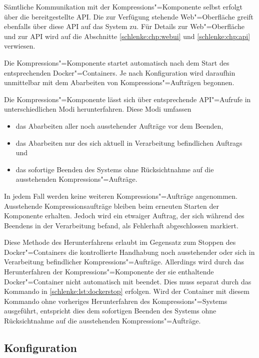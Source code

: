 Sämtliche Kommunikation mit der Kompressions"=Komponente selbst erfolgt über die bereitgestellte API. Die zur Verfügung stehende Web"=Oberfläche greift ebenfalls über diese API auf das System zu. Für Details zur Web"=Oberfläche und zur API wird auf die Abschnitte \ref{schlenke:chp:webui} und \ref{schlenke:chp:api} verwiesen.

Die Kompressions"=Komponente startet automatisch nach dem Start des entsprechenden Docker"=Containers. Je nach Konfiguration wird daraufhin unmittelbar mit dem Abarbeiten von Kompressions"=Aufträgen begonnen. 

Die Kompressions"=Komponente lässt sich über entsprechende API"=Aufrufe in unterschiedlichen Modi herunterfahren. Diese Modi umfassen
\begin{itemize}
\item das Abarbeiten aller noch ausstehender Aufträge vor dem Beenden,
\item das Abarbeiten nur des sich aktuell in Verarbeitung befindlichen Auftrags und
\item das sofortige Beenden des Systems ohne Rücksichtnahme auf die ausstehenden Kompressions"=Aufträge.
\end{itemize} 
In jedem Fall werden keine weiteren Kompressions"=Aufträge angenommen. Ausstehende Kompressionsaufträge bleiben beim erneuten Starten der Komponente erhalten. Jedoch wird ein etwaiger Auftrag, der sich während des Beendens in der Verarbeitung befand, als \glqq{}Fehlerhaft abgeschlossen\grqq{} markiert.

Diese Methode des Herunterfahrens erlaubt im Gegensatz zum Stoppen des Docker"=Containers die kontrollierte Handhabung noch ausstehender oder sich in Verarbeitung befindlicher Kompressions"=Aufträge. Allerdings wird durch das Herunterfahren der Kompressions"=Komponente der sie enthaltende Docker"=Container nicht automatisch mit beendet. Dies muss separat durch das Kommando in \autoref{schlenke:lst:dockerstop} erfolgen. Wird der Container mit diesem Kommando ohne vorheriges Herunterfahren des Kompressions"=Systems ausgeführt, entspricht dies dem sofortigen Beenden des Systems ohne Rücksichtnahme auf die ausstehenden Kompressions"=Aufträge.

\subsection{Konfiguration}
\label{schlenke:chp:configuration}


